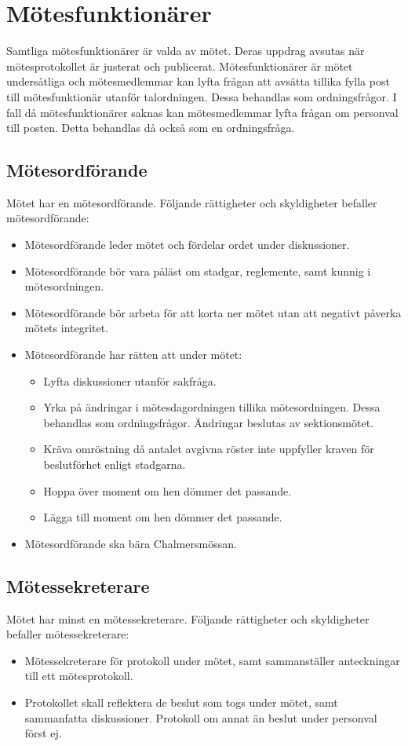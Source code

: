 \documentclass[11pt, includeaddress]{classes/cthit}
\begin{document}
\newpage

\newpage
\section{Mötesfunktionärer}
Samtliga mötesfunktionärer är valda av mötet. Deras uppdrag avsutas när mötesprotokollet är justerat och publicerat. Mötesfunktionärer är mötet undersåtliga och mötesmedlemmar kan lyfta frågan att avsätta tillika fylla post till mötesfunktionär utanför talordningen. Dessa behandlas som ordningsfrågor. I fall då mötesfunktionärer saknas kan mötesmedlemmar lyfta frågan om personval till posten.
Detta behandlas då också som en ordningsfråga.
\subsection{Mötesordförande}
Mötet har en mötesordförande. Följande rättigheter och skyldigheter befaller mötesordförande:
\begin{itemize}
    \item Mötesordförande leder mötet och fördelar ordet under diskussioner.
    \item Mötesordförande bör vara påläst om stadgar, reglemente, samt kunnig i mötesordningen.
    \item Mötesordförande bör arbeta för att korta ner mötet utan att negativt påverka mötets integritet.
    \item Mötesordförande har rätten att under mötet:
    \begin{itemize}
        \item Lyfta diskussioner utanför sakfråga.
        \item Yrka på ändringar i mötesdagordningen tillika mötesordningen. Dessa behandlas som ordningsfrågor. Ändringar beslutas av sektionsmötet.
        \item Kräva omröstning då antalet avgivna röster inte uppfyller kraven för beslutförhet enligt stadgarna.
        \item Hoppa över moment om hen dömmer det passande.
        \item Lägga till moment om hen dömmer det passande.
    \end{itemize}
    \item Mötesordförande ska bära Chalmersmössan.
\end{itemize}
\subsection{Mötessekreterare}
Mötet har minst en mötessekreterare. Följande rättigheter och skyldigheter befaller mötessekreterare:
\begin{itemize}
    \item Mötessekreterare för protokoll under mötet, samt sammanställer anteckningar till ett mötesprotokoll.
    \item Protokollet skall reflektera de beslut som togs under mötet, samt sammanfatta diskussioner. Protokoll om annat än beslut under personval först ej.
\end{itemize}
\end{document}
